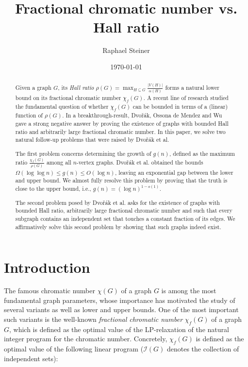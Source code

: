 \documentclass[a4paper,10pt]{amsart}
\author
{
Raphael Steiner 
}
\date{\today}
\title{Fractional chromatic number vs. Hall ratio}
\begin{document}
\maketitle

\begin{abstract}
Given a graph $G$, its \emph{Hall ratio} $\rho(G)=\max_{H\subseteq G}\frac{|V(H)|}{\alpha(H)}$ forms a natural lower bound on its fractional chromatic number $\chi_f(G)$. A recent line of research studied the fundamental question of whether $\chi_f(G)$ can be bounded in terms of a (linear) function of $\rho(G)$. In a breakthrough-result, Dvo\v{r}\'{a}k, Ossona de Mendez and Wu~\cite[\emph{Combinatorica}, 2020]{dvorak} gave a strong negative answer by proving the existence of graphs with bounded Hall ratio and arbitrarily large fractional chromatic number. In this paper, we solve two natural follow-up problems that were raised by Dvo\v{r}\'{a}k et al.

The first problem concerns determining the growth of $g(n)$, defined as the maximum ratio $\frac{\chi_f(G)}{\rho(G)}$ among all $n$-vertex graphs. Dvo\v{r}\'{a}k et al. obtained the bounds $\Omega(\log\log n) \le g(n)\le O(\log n)$, leaving an exponential gap between the lower and upper bound. We almost fully resolve this problem by proving that the truth is close to the upper bound, i.e., $g(n)=(\log n)^{1-o(1)}$. 

The second problem posed by Dvo\v{r}\'{a}k et al. asks for the existence of graphs with bounded Hall ratio, arbitrarily large fractional chromatic number and such that every subgraph contains an independent set that touches a constant fraction of its edges. We affirmatively solve this second problem by showing that such graphs indeed exist.
\end{abstract}

\section{Introduction}
The famous chromatic number $\chi(G)$ of a graph $G$ is among the most fundamental graph parameters, whose importance has motivated the study of several variants as well as lower and upper bounds. One of the most important such variants is the well-known \emph{fractional chromatic number} $\chi_f(G)$ of a graph $G$, which is defined as the optimal value of the LP-relaxation of the natural integer program for the chromatic number. Concretely, $\chi_f(G)$ is defined as the optimal value of the following linear program ($\mathcal{I}(G)$ denotes the collection of independent sets):
\end{document}

